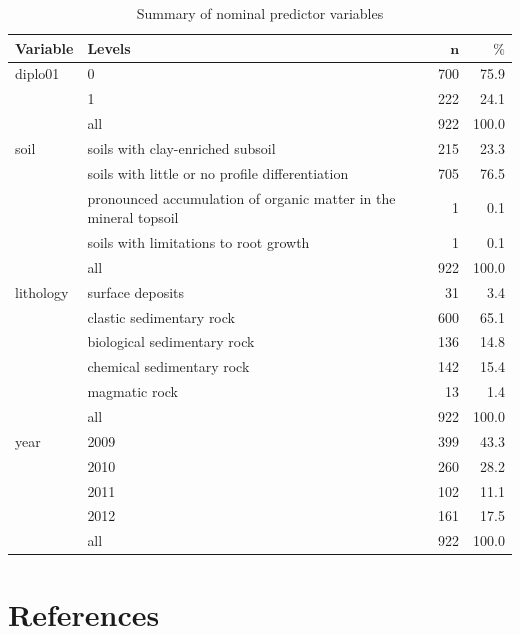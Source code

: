 \documentclass[review]{elsarticle}
\begin{document}
\begin{table}[H]
	\centering
	\begingroup\footnotesize
	\begin{tabular}{ll|rr}
	 \textbf{Variable} & \textbf{Levels} & $\mathbf{n}$ & $\mathbf{\%}$ \\
		\hline
	diplo01 & 0 & 700 & 75.9 \\
		 & 1 & 222 & 24.1 \\
		 \hline
	 & all & 922 & 100.0 \\
		 \hline
	\hline
	soil & soils with clay-enriched subsoil & 215 & 23.3 \\
		 & soils with little or no profile differentiation & 705 & 76.5 \\
		 & pronounced accumulation of organic matter in the mineral topsoil & 1 & 0.1 \\
		 & soils with limitations to root growth & 1 & 0.1 \\
		 \hline
	 & all & 922 & 100.0 \\
		 \hline
	\hline
	lithology & surface deposits & 31 & 3.4 \\
		 & clastic sedimentary rock & 600 & 65.1 \\
		 & biological sedimentary rock & 136 & 14.8 \\
		 & chemical sedimentary rock & 142 & 15.4 \\
		 & magmatic rock & 13 & 1.4 \\
		 \hline
	 & all & 922 & 100.0 \\
		 \hline
	\hline
	year & 2009 & 399 & 43.3 \\
		 & 2010 & 260 & 28.2 \\
		 & 2011 & 102 & 11.1 \\
		 & 2012 & 161 & 17.5 \\
		 \hline
	 & all & 922 & 100.0 \\
		 \hline
	\hline
	\end{tabular}
	\endgroup
	\caption{Summary of nominal predictor variables}
	\label{}
	\end{table}

\pagebreak

\section*{References}


\end{document}
